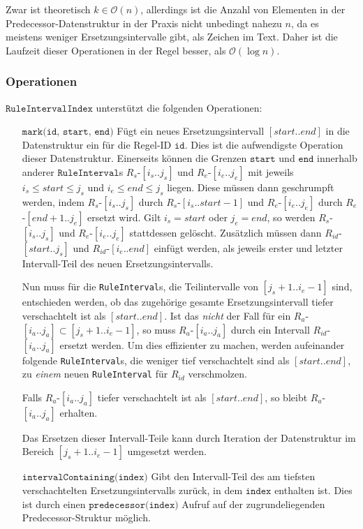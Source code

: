 Zwar ist theoretisch $k \in \mathcal{O}(n)$, allerdings ist die Anzahl von Elementen in der Predecessor-Datenstruktur in der Praxis nicht unbedingt nahezu $n$, da es meistens weniger Ersetzungsintervalle gibt, als Zeichen im Text. Daher ist die Laufzeit dieser Operationen in der Regel besser, als $\mathcal{O}(\log n)$.

\subsubsection{Operationen}

$\texttt{RuleIntervalIndex}$ unterstützt die folgenden Operationen:

\begin{itemize}[leftmargin=5cm]
	\item[$\texttt{mark(id, start, end)}$] Fügt ein neues Ersetzungsintervall $[start.. end]$ in die Datenstruktur ein für die Regel-ID $\texttt{id}$. Dies ist die aufwendigste Operation dieser Datenstruktur. 
    Einerseits können die Grenzen $\texttt{start}$ und $\texttt{end}$ innerhalb anderer $\texttt{RuleInterval}$s $R_s$-$[i_s..j_s]$ und $R_e$-$[i_e.. j_e]$ mit jeweils $i_s \leq start \leq j_s$ und $i_e \leq end \leq j_s$ liegen. Diese müssen dann geschrumpft werden, indem $R_s$-$[i_s..j_s]$ durch $R_s$-$[i_s..start - 1]$ und $R_e$-$[i_e..j_e]$ durch $R_e$-$[end + 1..j_e]$ ersetzt wird. Gilt $i_s = start$ oder $j_e = end$, so werden $R_s$-$[i_s..j_s]$ und $R_e$-$[i_e.. j_e]$ stattdessen gelöscht.
    Zusätzlich müssen dann $R_{id}$-$[start..j_s]$ und $R_{id}$-$[i_e..end]$ einfügt werden, als jeweils erster und letzter Intervall-Teil des neuen Ersetzungsintervalls.
    
    Nun muss für die \texttt{RuleInterval}s, die Teilintervalle von $[j_s + 1..i_e - 1]$ sind, entschieden werden, ob das zugehörige gesamte Ersetzungsintervall tiefer verschachtelt ist als $[start.. end]$.
    Ist das \emph{nicht} der Fall für ein $R_a$-$[i_a..j_a] \subset [j_s + 1..i_e - 1]$, so muss $R_a$-$[i_a..j_a]$ durch ein Intervall $R_{id}$-$[i_a..j_a]$ ersetzt werden. Um dies effizienter zu machen, werden aufeinander folgende \texttt{RuleInterval}s, die weniger tief verschachtelt sind als $[start.. end]$, zu \emph{einem} neuen \texttt{RuleInterval} für $R_{id}$ verschmolzen.

    Falls $R_a$-$[i_a..j_a]$ tiefer verschachtelt ist als $[start.. end]$, so bleibt $R_a$-$[i_a..j_a]$ erhalten. 

    Das Ersetzen dieser Intervall-Teile kann durch Iteration der Datenstruktur im Bereich $[j_s + 1..i_e - 1]$ umgesetzt werden. 
	\item[$\texttt{intervalContaining(index)}$] Gibt den Intervall-Teil des am tiefsten verschachtelten Ersetzungsintervalls zurück, in dem $\texttt{index}$ enthalten ist. Dies ist durch einen $\texttt{predecessor(index)}$ Aufruf auf der zugrundeliegenden Predecessor-Struktur möglich.
\end{itemize}

